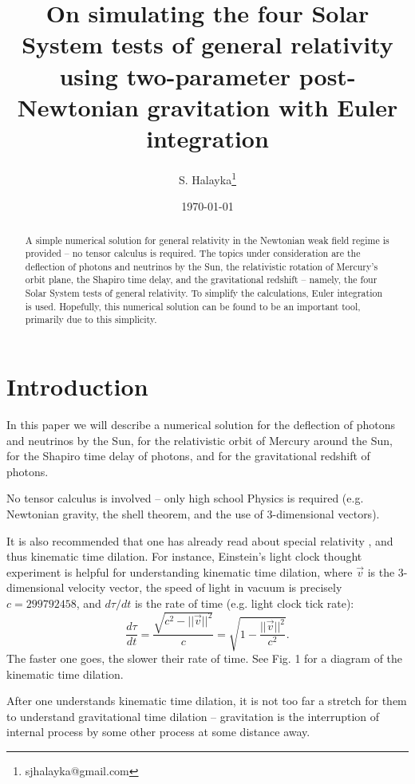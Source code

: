 \documentclass[12pt]{article}
\title{On simulating the four Solar System tests of general relativity using two-parameter post-Newtonian gravitation with Euler integration}
\author{S. Halayka\footnote{sjhalayka@gmail.com}}
\date{\today\;\currenttime}
\begin{document}
 
\maketitle

\begin{abstract}
A simple numerical solution for general relativity in the Newtonian weak field regime is provided -- no tensor calculus is required.
The topics under consideration are the deflection of photons and neutrinos by the Sun, the relativistic rotation of Mercury's orbit plane, the Shapiro time delay, and the gravitational redshift -- namely, the four Solar System tests of general relativity.
To simplify the calculations, Euler integration is used.
Hopefully, this numerical solution can be found to be an important tool, primarily due to this simplicity.
\end{abstract}


\section{Introduction}

In this paper we will describe a numerical solution for the deflection of photons and neutrinos by the Sun, for the relativistic orbit of Mercury around the Sun, for the Shapiro time delay of photons, and for the gravitational redshift of photons.

No tensor calculus is involved -- only high school Physics is required (e.g. Newtonian gravity, the shell theorem, and the use of 3-dimensional vectors).

It is also recommended that one has already read about special relativity \cite{einstein, morin}, and thus kinematic time dilation.
For instance, Einstein's light clock thought experiment is helpful for understanding kinematic time dilation, where $\vec{v}$ is the 3-dimensional velocity vector, the speed of light in vacuum is precisely $c = 299792458$, and $d\tau/dt$ is the rate of time (e.g. light clock tick rate):
\begin{equation}
\label{eq_intro_kinematic}
\frac{d\tau}{dt} = \frac{\sqrt{c^2 - \lvert\lvert \vec{v}\rvert\rvert^2}}{c} = \sqrt{1 - \frac{\lvert\lvert \vec{v}\rvert\rvert^2}{c^2}}.
\end{equation}
The faster one goes, the slower their rate of time.
See Fig. 1 for a diagram of the kinematic time dilation.

After one understands kinematic time dilation, it is not too far a stretch for them to understand gravitational time dilation -- gravitation is the interruption of internal process by some other process at some distance away.
\end{document}
